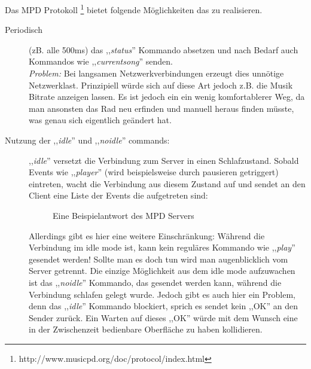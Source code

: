 Das MPD Protokoll \footnote{http://www.musicpd.org/doc/protocol/index.html} bietet folgende Möglichkeiten das zu realisieren.
\begin{description}
    \item [Periodisch] (zB. alle 500ms) das ,,\textit{status}'' Kommando absetzen und nach Bedarf auch Kommandos wie ,,\textit{currentsong}''
        senden.
        \\
        \emph{Problem:} Bei langsamen Netzwerkverbindungen erzeugt dies unnötige Netzwerklast. 
        Prinzipiell würde sich auf diese Art jedoch z.B. die Musik Bitrate anzeigen lassen. Es ist jedoch ein ein wenig
        komfortablerer Weg, da man ansonsten das Rad neu erfinden und manuell heraus finden müsste, 
        was genau sich eigentlich geändert hat.
    \item [Nutzung der ,,\textit{idle}'' und ,,\textit{noidle}'' commands:]
        ,,\textit{idle}'' versetzt die Verbindung zum Server in einen Schlafzustand. Sobald Events wie ,,\textit{player}'' (wird beispielsweise durch pausieren getriggert) 
        eintreten, wacht die Verbindung aus diesem Zustand auf und sendet an den Client eine Liste der Events die aufgetreten sind:

	\begin{figure}[h!]
	  
	  \caption{Eine Beispielantwort des MPD Servers}
	  \label{dd_state}
	\end{figure}

        Allerdings gibt es hier eine weitere Einschränkung: Während die Verbindung im idle mode ist, kann kein reguläres Kommando wie ,,\textit{play}'' gesendet werden!
        Sollte man es doch tun wird man augenblicklich vom Server getrennt.
        Die einzige Möglichkeit aus dem idle mode aufzuwachen ist das ,,\textit{noidle}'' Kommando, das gesendet werden
        kann, während die Verbindung schlafen gelegt wurde.
        Jedoch gibt es auch hier ein Problem, denn das ,,\textit{idle}'' Kommando blockiert, sprich es sendet kein ,,OK'' an den  Sender zurück.
        Ein Warten auf dieses ,,OK'' würde mit dem Wunsch eine in der Zwischenzeit bedienbare Oberfläche zu haben kollidieren.
\end{description}

